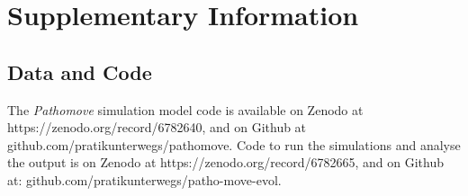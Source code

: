 


{ \begin{center}  \end{center} }

\newpage

\begingroup

\let\clearpage\relax
\let\cleardoublepage\relax
\let\cleardoublepage\relax

{\chapter*{Supplementary Information}}

\section*{Data and Code}

The \textit{Pathomove} simulation model code is available on Zenodo at https://zenodo.org/record/6782640, and on Github at github.com/pratikunterwegs/pathomove.
Code to run the simulations and analyse the output is on Zenodo at https://zenodo.org/record/6782665, and on Github at: 
github.com/pratikunterwegs/patho-move-evol.


